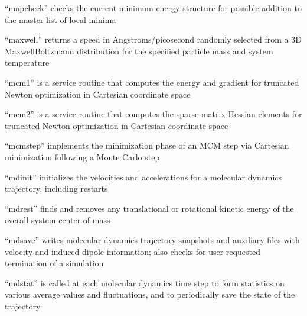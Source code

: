 \documentclass[letterpaper,11pt,english]{sphinxmanual}
\begin{document}

“mapcheck” checks the current minimum energy structure for possible addition to the master list of local minima


“maxwell” returns a speed in Angstroms/picosecond randomly selected from a 3\sphinxhyphen{}D Maxwell\sphinxhyphen{}Boltzmann distribution for the specified particle mass and system temperature


“mcm1” is a service routine that computes the energy and gradient for truncated Newton optimization in Cartesian coordinate space


“mcm2” is a service routine that computes the sparse matrix Hessian elements for truncated Newton optimization in Cartesian coordinate space


“mcmstep” implements the minimization phase of an MCM step via Cartesian minimization following a Monte Carlo step


“mdinit” initializes the velocities and accelerations for a molecular dynamics trajectory, including restarts


“mdrest” finds and removes any translational or rotational kinetic energy of the overall system center of mass


“mdsave” writes molecular dynamics trajectory snapshots and auxiliary files with velocity and induced dipole information; also checks for user requested termination of a simulation


“mdstat” is called at each molecular dynamics time step to form statistics on various average values and fluctuations, and to periodically save the state of the trajectory




\end{document}
